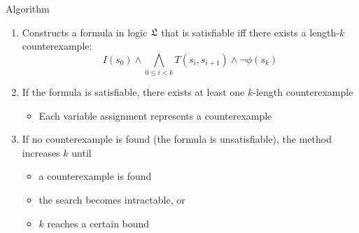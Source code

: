 \begin{frame}{Algorithm}
\begin{enumerate}
\itemsep1.2em
\item Constructs a formula in logic $\mathfrak{L}$ that is satisfiable iff there exists a
length-$k$ counterexample:
$$I(s_0) \wedge \bigwedge_{0 \leq i < k} T(s_i, s_{i+1}) \wedge \neg \phi(s_k)$$

\item If the formula is satisfiable, there exists at least one
$k$-length counterexample
\begin{itemize}
  \item Each variable assignment represents a counterexample
\end{itemize}

\item If no counterexample is found (the formula is unsatisfiable), the method
increases $k$ until
\begin{itemize}
  \item a counterexample is found
  \item the search becomes intractable, or
  \item $k$ reaches a certain bound
\end{itemize}
\end{enumerate}
\end{frame}


